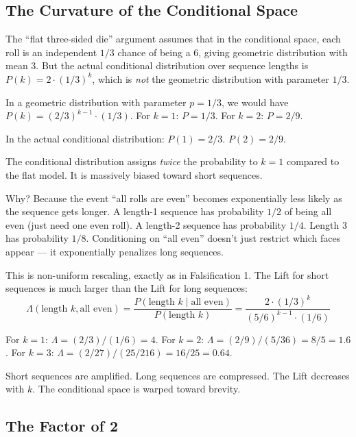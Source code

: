 \documentclass[12pt]{article}
\begin{document}
\subsection{The Curvature of the Conditional Space}

The ``flat three-sided die'' argument assumes that in the conditional space, each roll is an independent $1/3$ chance of being a 6, giving geometric distribution with mean 3. But the actual conditional distribution over sequence lengths is $P(k) = 2 \cdot (1/3)^k$, which is \textit{not} the geometric distribution with parameter $1/3$.

In a geometric distribution with parameter $p = 1/3$, we would have $P(k) = (2/3)^{k-1} \cdot (1/3)$. For $k=1$: $P = 1/3$. For $k=2$: $P = 2/9$.

In the actual conditional distribution: $P(1) = 2/3$. $P(2) = 2/9$.

The conditional distribution assigns \textit{twice} the probability to $k=1$ compared to the flat model. It is massively biased toward short sequences.

Why? Because the event ``all rolls are even'' becomes exponentially less likely as the sequence gets longer. A length-1 sequence has probability $1/2$ of being all even (just need one even roll). A length-2 sequence has probability $1/4$. Length 3 has probability $1/8$. Conditioning on ``all even'' doesn't just restrict which faces appear --- it exponentially penalizes long sequences.

This is non-uniform rescaling, exactly as in Falsification 1. The Lift for short sequences is much larger than the Lift for long sequences:
\begin{equation}
\Lambda(\text{length } k, \text{all even}) = \frac{P(\text{length } k \mid \text{all even})}{P(\text{length } k)} = \frac{2 \cdot (1/3)^k}{(5/6)^{k-1} \cdot (1/6)}
\end{equation}

For $k=1$: $\Lambda = (2/3) / (1/6) = 4$. For $k=2$: $\Lambda = (2/9) / (5/36) = 8/5 = 1.6$. For $k=3$: $\Lambda = (2/27) / (25/216) = 16/25 = 0.64$.

Short sequences are amplified. Long sequences are compressed. The Lift decreases with $k$. The conditional space is warped toward brevity.

\subsection{The Factor of 2}
\end{document}
